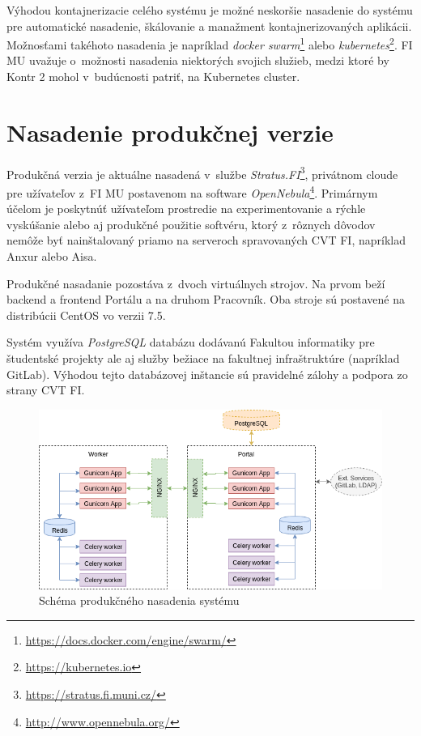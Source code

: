 \documentclass[
  digital, %
  oneside, %
  table,   %
  lof,     %
  lot,   %
]{fithesis3}
\begin{document}
Výhodou kontajnerizacie celého systému je možné neskoršie nasadenie do systému pre automatické nasadenie, škálovanie a manažment kontajnerizovaných aplikácii. Možnosťami takéhoto nasadenia je napríklad \emph{docker swarm}\footnote{\url{https://docs.docker.com/engine/swarm/}} alebo \emph{kubernetes}\footnote{\url{https://kubernetes.io}}. FI MU uvažuje o~možnosti nasadenia niektorých svojich služieb, medzi ktoré by Kontr 2 mohol v~budúcnosti patriť, na Kubernetes cluster. 

\section{Nasadenie produkčnej verzie}
\label{deploy-prod}

Produkčná verzia je aktuálne nasadená v~službe \emph{Stratus.FI}\footnote{\url{https://stratus.fi.muni.cz/}}, privátnom cloude pre užívateľov z~FI MU postavenom na software \emph{OpenNebula}\footnote{\url{http://www.opennebula.org/}}.
Primárnym účelom je poskytnúť užívateľom prostredie na experimentovanie a rýchle vyskúšanie alebo aj produkčné použitie softvéru, ktorý z~rôznych dôvodov nemôže byť nainštalovaný priamo na serveroch spravovaných CVT FI, napríklad Anxur alebo Aisa\cite{fi-tech-stratus}.

Produkčné nasadanie pozostáva z~dvoch virtuálnych strojov. Na prvom beží backend a frontend Portálu a na druhom Pracovník. Oba stroje sú postavené na distribúcii CentOS vo verzii 7.5.

Systém využíva \emph{PostgreSQL} databázu dodávanú Fakultou informatiky pre študentské projekty ale aj služby bežiace na fakultnej infraštruktúre (napríklad GitLab). Výhodou tejto databázovej inštancie sú pravidelné zálohy a podpora zo strany CVT FI.

\begin{figure}[!ht]
  \begin{center}
    \includegraphics[width=\textwidth]{imgs/sys-deploy.png}
  \end{center}
    \caption{Schéma produkčného nasadenia systému}
    \label{fig:prod-deploy}
\end{figure}
\end{document}
